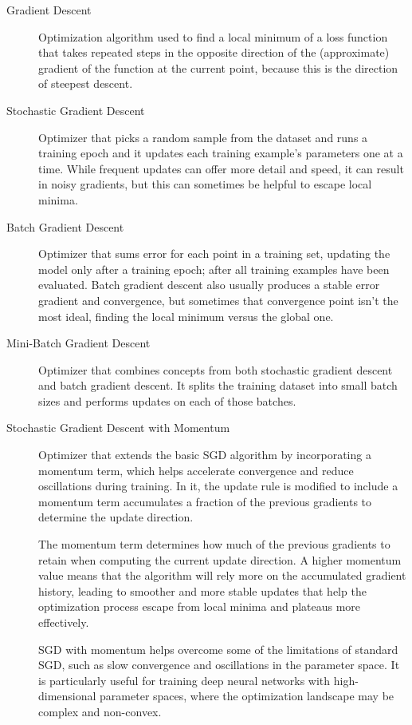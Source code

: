 \documentclass[a4paper]{article}
\begin{document}
\begin{description}
\item[Gradient Descent]
Optimization algorithm used to find a local minimum of a loss function that takes repeated steps in the opposite direction of the (approximate) gradient of the function at the current point, because this is the direction of steepest descent.

\item[Stochastic Gradient Descent]
Optimizer that picks a random sample from the dataset and runs a training epoch and it updates each training example's parameters one at a time. While frequent updates can offer more detail and speed, it can result in noisy gradients, but this can sometimes be helpful to escape local minima.

\item[Batch Gradient Descent]
Optimizer that sums error for each point in a training set, updating the model only after a training epoch; after all training examples have been evaluated. Batch gradient descent also usually produces a stable error gradient and convergence, but sometimes that convergence point isn't the most ideal, finding the local minimum versus the global one.

\item[Mini-Batch Gradient Descent]
Optimizer that combines concepts from both stochastic gradient descent and batch gradient descent. It splits the training dataset into small batch sizes and performs updates on each of those batches.

\item[Stochastic Gradient Descent with Momentum]
Optimizer that extends the basic SGD algorithm by incorporating a momentum term, which helps accelerate convergence and reduce oscillations during training. In it, the update rule is modified to include a momentum term accumulates a fraction of the previous gradients to determine the update direction. 

The momentum term determines how much of the previous gradients to retain when computing the current update direction. A higher momentum value means that the algorithm will rely more on the accumulated gradient history, leading to smoother and more stable updates that help the optimization process escape from local minima and plateaus more effectively.

SGD with momentum helps overcome some of the limitations of standard SGD, such as slow convergence and oscillations in the parameter space. It is particularly useful for training deep neural networks with high-dimensional parameter spaces, where the optimization landscape may be complex and non-convex.


\end{description}
\end{document}
